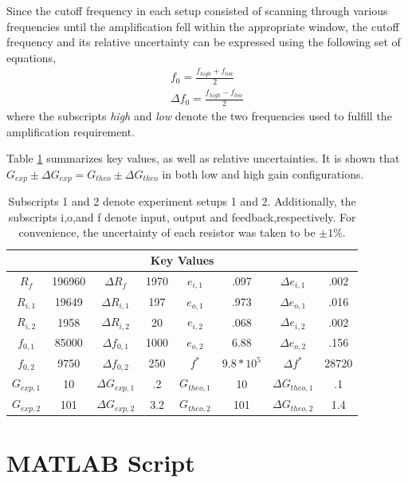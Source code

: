 \documentclass[letterpaper,12pt]{article}
\begin{document}
Since the cutoff frequency in each setup consisted of scanning through various frequencies until the amplification fell within the appropriate window, the cutoff frequency and its relative uncertainty can be expressed using the following set of equations,
\begin{equation}
    \begin{split}
        f_0 = \frac{f_{high} + f_{low}}{2}\\
        \Delta f_0 = \frac{f_{high} - f_{low}}{2}
    \end{split}
\end{equation}
where the subscripts \textit{high} and \textit{low} denote the two frequencies used to fulfill the amplification requirement.

Table \ref{KeyValues} summarizes key values, as well as relative uncertainties. It is shown that $G_{exp} \pm{\Delta G_{exp}} = G_{theo} \pm{\Delta G_{theo}}$ in both low and high gain configurations.
\begin{table}[ht]
    \centering
    \begin{tabular}{ c | c | c | c ||c | c | c | c }
    \multicolumn{8}{c}{Key Values} \\
    \hline
    $R_f$ & 196960 & $\Delta R_f$ & 1970 & $e_{i,1}$ & .097 & $\Delta e_{i,1}$ & .002  \\
    $R_{i,1}$ & 19649 & $\Delta R_{i,1}$ & 197 & $e_{o,1}$ & .973 & $\Delta e_{o,1}$ & .016    \\
    $R_{i,2}$ & 1958 & $\Delta R_{i,2}$ & 20 & $e_{i,2}$ & .068 & $\Delta e_{i,2}$ & .002     \\
    $f_{0,1}$ & 85000 & $\Delta f_{0,1}$ & 1000 & $e_{o,2}$ & 6.88 & $\Delta e_{o,2}$ & .156  \\
    $f_{0,2}$ & 9750 & $\Delta f_{0,2}$ & 250 &  $f^*$ & $9.8*10^{5}$ & $\Delta f^*$ & 28720  \\
    \hline
    $G_{exp,1}$ & 10 & $\Delta G_{exp,1}$ & .2 & $G_{theo,1}$ & 10 & $\Delta G_{theo,1}$ & .1 \\
    $G_{exp,2}$ & 101 & $\Delta G_{exp,2}$ & 3.2 & $G_{theo,2}$ & 101 & $\Delta G_{theo,2}$ & 1.4 
    \end{tabular}
    \caption{\small Subscripts 1 and 2 denote experiment setups 1 and 2. Additionally, the subscripts i,o,and f denote input, output and feedback,respectively. For convenience, the uncertainty of each resistor was taken to be $\pm{1\%}$.}
    \label{KeyValues}
\end{table}

\newpage
\appendix
\section{MATLAB Script}

\end{document}
